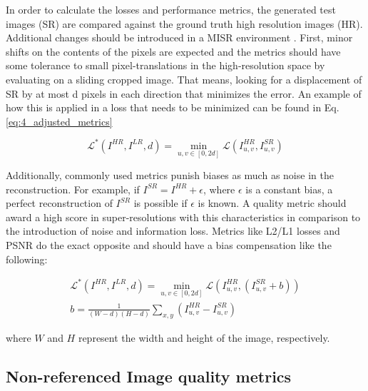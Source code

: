             In order to calculate the losses and performance metrics, the generated test images (SR) are compared against the ground truth high resolution images (HR).
            Additional changes should be introduced in a MISR environment \cite{martens2019superresolution}.
            First, minor shifts on the contents of the pixels are expected and the metrics should have some tolerance to small pixel-translations in the high-resolution space by evaluating on a sliding cropped image. 
            That means, looking for a displacement of SR by at most d pixels in each direction that minimizes the error. 
            An example of how this is applied in a loss that needs to be minimized can be found in Eq. \ref{eq:4_adjusted_metrics}
    
            \begin{equation}
               \mathcal{L}^* ( I^{HR}, I^{LR}, d) = \min_{u,v \in [0,2d]} \mathcal{L} ( I^{HR}_{u,v}, I^{SR}_{u,v})
            \label{eq:4_adjusted_metrics}
            \end{equation}
    
            Additionally, commonly used metrics punish biases as much as noise in the reconstruction.
            For example, if $I^{SR} = I^{HR} + \epsilon$, where $\epsilon$ is a constant bias, a perfect reconstruction of $I^{SR}$ is possible if $\epsilon$ is known. 
            A quality metric should award a high score in super-resolutions with this characteristics in comparison to the introduction of noise and information loss. Metrics like L2/L1 losses and PSNR do the exact opposite and should have a bias compensation like the following: 
    
            \begin{equation}
                \begin{aligned}
                    \mathcal{L}^* ( I^{HR}, I^{LR}, d) = \min_{u,v \in [0,2d]} \mathcal{L} ( I^{HR}_{u,v}, (I^{SR}_{u,v}+b)) \\
                    b = \frac{1}{(W - d)(H - d)} \sum_{x,y} \left( I^{HR}_{u,v} - I^{SR}_{u,v} \right)
               \end{aligned}
            \end{equation}
    
            \noindent where $W$ and $H$ represent the width and height of the image, respectively.
    

    \subsection{Non-referenced Image quality metrics}

